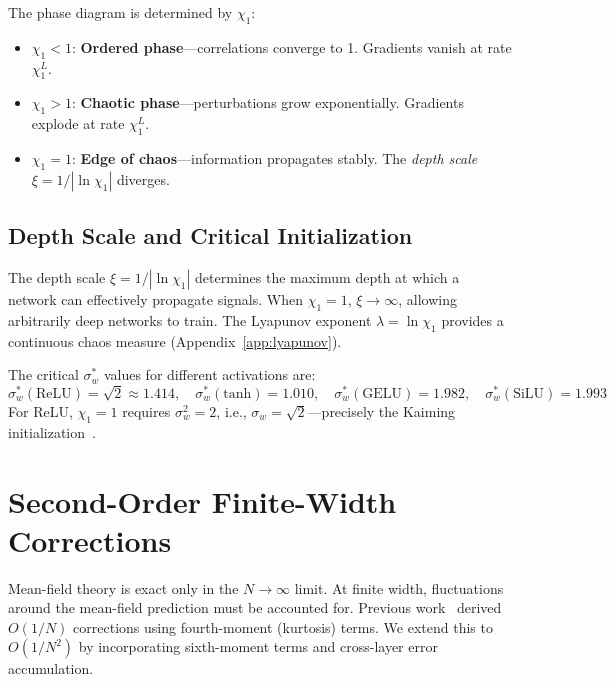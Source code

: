 \documentclass[10pt]{article}
\begin{document}
The phase diagram is determined by $\chi_1$:
\begin{itemize}[nosep]
    \item $\chi_1 < 1$: \textbf{Ordered phase}---correlations converge to 1. Gradients vanish at rate $\chi_1^L$.
    \item $\chi_1 > 1$: \textbf{Chaotic phase}---perturbations grow exponentially. Gradients explode at rate $\chi_1^L$.
    \item $\chi_1 = 1$: \textbf{Edge of chaos}---information propagates stably. The \emph{depth scale} $\xi = 1/|\ln \chi_1|$ diverges.
\end{itemize}

\subsection{Depth Scale and Critical Initialization}

The depth scale $\xi = 1/|\ln \chi_1|$ determines the maximum depth at which a network can effectively propagate signals.
When $\chi_1 = 1$, $\xi \to \infty$, allowing arbitrarily deep networks to train.
The Lyapunov exponent $\lambda = \ln\chi_1$ provides a continuous chaos measure (Appendix~\ref{app:lyapunov}).

The critical $\sigma_w^*$ values for different activations are:
\begin{equation}
    \sigma_w^*(\text{ReLU}) = \sqrt{2} \approx 1.414, \quad
    \sigma_w^*(\text{tanh}) = 1.010, \quad
    \sigma_w^*(\text{GELU}) = 1.982, \quad
    \sigma_w^*(\text{SiLU}) = 1.993
    \label{eq:eoc-values}
\end{equation}
For ReLU, $\chi_1 = 1$ requires $\sigma_w^2 = 2$, i.e., $\sigma_w = \sqrt{2}$---precisely the Kaiming initialization~\cite{he2015delving}.

\section{Second-Order Finite-Width Corrections}
\label{sec:finite-width}

Mean-field theory is exact only in the $N \to \infty$ limit.
At finite width, fluctuations around the mean-field prediction must be accounted for.
Previous work~\cite{hanin2018neural} derived $O(1/N)$ corrections using fourth-moment (kurtosis) terms.
We extend this to $O(1/N^2)$ by incorporating sixth-moment terms and cross-layer error accumulation.
\end{document}
